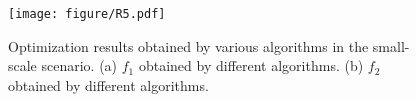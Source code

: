 \documentclass[10pt,journal,compsoc]{IEEEtran}
\begin{document}

\begin{figure}[t] 
    \centering  %
    \texttt{[image: figure/R5.pdf]}  %
    \caption{Optimization results obtained by various algorithms in the small-scale scenario. (a) $f_1$ obtained by different algorithms. (b) $f_2$ obtained by different algorithms.}  %
    \label{zhuxingtu_8}
\end{figure}


\end{document}
